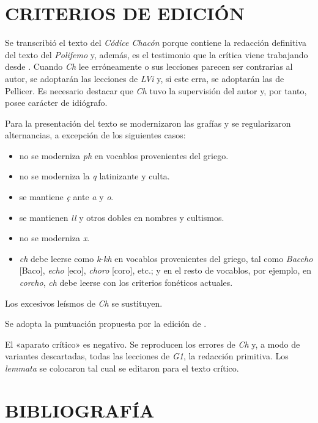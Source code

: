 \documentclass[11pt,a4paper,twoside]{article}
\newcommand{\comillas}[1]{«#1»}
\begin{document}
\section*{\centering\fontsize{11}{14}\selectfont CRITERIOS DE EDICIÓN}

Se transcribió el texto del \emph{Códice Chacón} porque contiene la redacción definitiva del texto del \emph{Polifemo} y, además, es el testimonio que la crítica viene trabajando desde \textcite{Fouché-Delbosc1900}. Cuando \emph{Ch} lee erróneamente o sus lecciones parecen ser contrarias al autor, se adoptarán las lecciones de \emph{LVi} y, si este erra, se adoptarán las de Pellicer. Es necesario destacar que \emph{Ch} tuvo la supervisión del autor y, por tanto, posee carácter de idiógrafo.\par
%
Para la presentación del texto se modernizaron las grafías y se regularizaron alternancias, a excepción de los siguientes casos: 
%
\begin{itemize}[label=--]%
\item no se moderniza \emph{ph} en vocablos provenientes del griego.
\item no se moderniza la \emph{q} latinizante y culta.
\item se mantiene \emph{ç} ante \emph{a} y \emph{o}. 
\item se mantienen \emph{ll} y otros dobles en nombres y cultismos.
\item no se moderniza \emph{x}.
\item \emph{ch} debe leerse como \emph{k}-\emph{kh} en vocablos provenientes del griego, tal como \emph{Baccho} [Baco], \emph{echo} [eco], \emph{choro} [coro], etc.; y en el resto de vocablos, por ejemplo, en \emph{corcho}, \emph{ch} debe leerse con los criterios fonéticos actuales.
\end{itemize}\par
%
Los excesivos leísmos de \emph{Ch} se sustituyen.\par
%
Se adopta la puntuación propuesta por la edición de \textcite{Alonso1967}.\par
%
El \comillas{aparato crítico} es negativo. Se reproducen los errores de \emph{Ch} y, a modo de variantes descartadas, todas las lecciones de \emph{G1}, la redacción primitiva. Los \emph{lemmata} se colocaron tal cual se editaron para el texto crítico.\par

\section*{\centering\fontsize{11}{14}\selectfont BIBLIOGRAFÍA}
\nocite{*}
\printbibliography[heading=none]
\newpage
\end{document}
